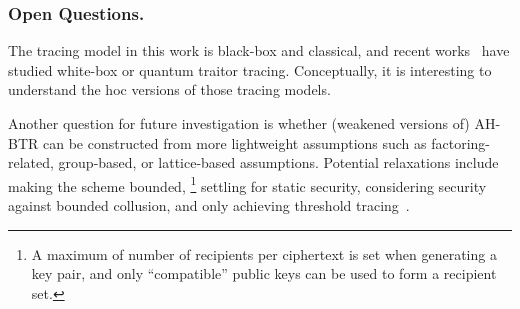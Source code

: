 \subsubsection{Open Questions.}
The tracing model in this work is black-box and classical, and recent works~\cite{C:Zhandry21,TCC:Zhandry20} have studied white-box or quantum traitor tracing.
Conceptually, it is interesting to understand the \ad hoc versions of those tracing models.

Another question for future investigation is whether
(weakened versions of) AH-BTR can be constructed from more lightweight assumptions such as factoring-related, group-based, or lattice-based assumptions.
Potential relaxations include
making the scheme bounded,%
\footnote{A maximum of number of recipients per ciphertext is set when generating a key pair, and only ``compatible'' public keys can be used to form a recipient set.}
settling for static security,
considering security against bounded collusion, and
only achieving threshold tracing~\cite{C:NaoPin98}.
